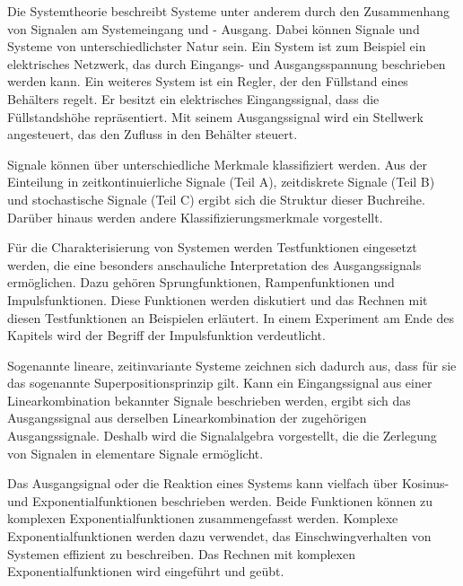 Die Systemtheorie beschreibt Systeme unter anderem durch den Zusammenhang von Signalen am Systemeingang und - Ausgang. Dabei k\"{o}nnen Signale und Systeme von unterschiedlichster Natur sein. Ein System ist zum Beispiel ein elektrisches Netzwerk, das durch Eingangs- und Ausgangsspannung beschrieben werden kann. Ein weiteres System ist ein Regler, der den F\"{u}llstand eines Beh\"{a}lters regelt. Er besitzt ein elektrisches Eingangssignal, dass die F\"{u}llstandsh\"{o}he repr\"{a}sentiert. Mit seinem Ausgangssignal wird ein Stellwerk angesteuert, das den Zufluss in den Beh\"{a}lter steuert.\newline

\noindent Signale k\"{o}nnen \"{u}ber unterschiedliche Merkmale klassifiziert werden. Aus der Einteilung in zeitkontinuierliche Signale (Teil A), zeitdiskrete Signale (Teil B) und stochastische Signale (Teil C) ergibt sich die Struktur dieser Buchreihe. Dar\"{u}ber hinaus werden andere Klassifizierungsmerkmale vorgestellt.\newline

\noindent F\"{u}r die Charakterisierung von Systemen werden Testfunktionen eingesetzt werden, die eine besonders anschauliche Interpretation des Ausgangssignals erm\"{o}glichen. Dazu geh\"{o}ren Sprungfunktionen, Rampenfunktionen und Impulsfunktionen. Diese Funktionen werden diskutiert und das Rechnen mit diesen Testfunktionen an Beispielen erl\"{a}utert. In einem Experiment am Ende des Kapitels wird der Begriff der Impulsfunktion verdeutlicht.\newline

\noindent Sogenannte lineare, zeitinvariante Systeme zeichnen sich dadurch aus, dass f\"{u}r sie das sogenannte Superpositionsprinzip gilt. Kann ein Eingangssignal aus einer Linearkombination bekannter Signale beschrieben werden, ergibt sich das Ausgangssignal aus derselben Linearkombination der zugeh\"{o}rigen Ausgangssignale. Deshalb wird die Signalalgebra vorgestellt, die die Zerlegung von Signalen in elementare Signale erm\"{o}glicht.\newline

\noindent Das Ausgangsignal oder die Reaktion eines Systems kann vielfach \"{u}ber Kosinus- und Exponentialfunktionen beschrieben werden. Beide Funktionen k\"{o}nnen zu komplexen Exponentialfunktionen zusammengefasst werden. Komplexe Exponentialfunktionen werden dazu verwendet, das Einschwingverhalten von Systemen effizient zu beschreiben. Das Rechnen mit komplexen Exponentialfunktionen wird eingef\"{u}hrt und ge\"{u}bt.\newline

